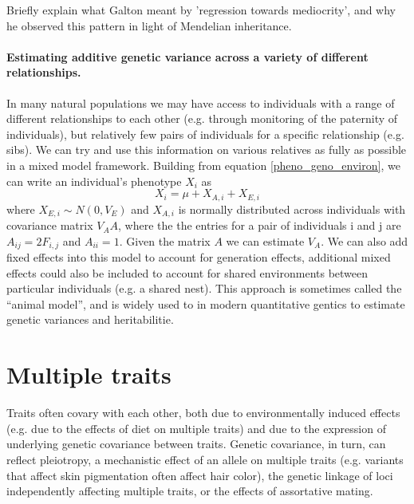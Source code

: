 \begin{question}
Briefly explain what Galton meant by 'regression towards
mediocrity', and why he observed this pattern in light of Mendelian inheritance.
\end{question}

\paragraph{Estimating additive genetic variance across a variety of
  different relationships.}

In many natural populations we may have access to individuals with a
range of different relationships to each other (e.g. through monitoring
of the paternity of individuals), but relatively few pairs of individuals for a specific relationship (e.g. sibs). We can try and use this information on various relatives as
fully as possible in a mixed model framework. Building from equation
\ref{pheno_geno_environ}, we can write an individual's phenotype $X_i$
 as 
\begin{equation}
X_i =  \mu  + X_{A,i} + X_{E,i} 
\end{equation}
where $X_{E,i} \sim N(0,V_E)$  and $X_{A,i}$ is normally distributed across
individuals with covariance matrix $V_A A$, where the the entries for
a pair of individuals i and j are 
$A_{ij}= 2 F_{i,j}$ and $A_{ii}= 1$. Given the matrix $A$ we can estimate $V_A$. We can
also add fixed effects into this model to account for generation
effects, additional mixed effects could also be included to account
for shared environments between particular individuals (e.g. a shared nest).
This approach is sometimes called the ``animal model'', and is widely
used to in modern quantitative gentics to estimate genetic variances and heritabilitie. 



\section{Multiple traits}

Traits often covary with each other, both due to environmentally
induced effects (e.g. due to the effects of diet on multiple traits)
and due to the expression of underlying genetic covariance between
traits. Genetic covariance, in turn, can reflect pleiotropy, a
mechanistic effect of an allele on multiple traits (e.g. variants that
affect skin pigmentation often affect hair color), the genetic
linkage of loci independently affecting multiple traits, or the effects of assortative mating. 

